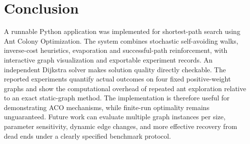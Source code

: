 \documentclass[conference]{IEEEtran}
\begin{document}
\section{Conclusion}
A runnable Python application was implemented for shortest-path search using Ant Colony Optimization. The system combines stochastic self-avoiding walks, inverse-cost heuristics, evaporation and successful-path reinforcement, with interactive graph visualization and exportable experiment records. An independent Dijkstra solver makes solution quality directly checkable. The reported experiments quantify actual outcomes on four fixed positive-weight graphs and show the computational overhead of repeated ant exploration relative to an exact static-graph method. The implementation is therefore useful for demonstrating ACO mechanisms, while finite-run optimality remains unguaranteed. Future work can evaluate multiple graph instances per size, parameter sensitivity, dynamic edge changes, and more effective recovery from dead ends under a clearly specified benchmark protocol.
\end{document}

